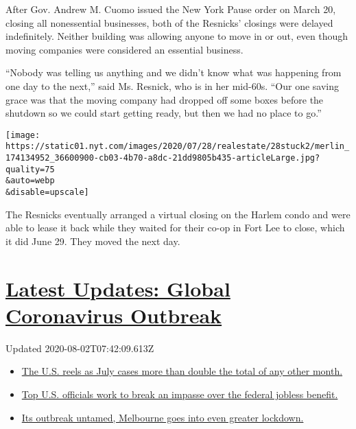 After Gov. Andrew M. Cuomo issued the New York Pause order on March 20,
closing all nonessential businesses, both of the Resnicks' closings were
delayed indefinitely. Neither building was allowing anyone to move in or
out, even though moving companies were considered an essential business.

``Nobody was telling us anything and we didn't know what was happening
from one day to the next,'' said Ms. Resnick, who is in her mid-60s.
``Our one saving grace was that the moving company had dropped off some
boxes before the shutdown so we could start getting ready, but then we
had no place to go.''

\texttt{[image: https://static01.nyt.com/images/2020/07/28/realestate/28stuck2/merlin\_174134952\_36600900-cb03-4b70-a8dc-21dd9805b435-articleLarge.jpg?quality=75\\\&auto=webp\\\&disable=upscale]}

The Resnicks eventually arranged a virtual closing on the Harlem condo
and were able to lease it back while they waited for their co-op in Fort
Lee to close, which it did June 29. They moved the next day.

\hypertarget{latest-updates-global-coronavirus-outbreak}{%
\section{\texorpdfstring{\href{https://www.nytimes.com/2020/08/01/world/coronavirus-covid-19.html?action=click\&pgtype=Article\&state=default\&region=MAIN_CONTENT_1\&context=storylines_live_updates}{Latest
Updates: Global Coronavirus
Outbreak}}{Latest Updates: Global Coronavirus Outbreak}}\label{latest-updates-global-coronavirus-outbreak}}

Updated 2020-08-02T07:42:09.613Z

\begin{itemize}
\tightlist
\item
  \href{https://www.nytimes.com/2020/08/01/world/coronavirus-covid-19.html?action=click\&pgtype=Article\&state=default\&region=MAIN_CONTENT_1\&context=storylines_live_updates\#link-34047410}{The
  U.S. reels as July cases more than double the total of any other
  month.}
\item
  \href{https://www.nytimes.com/2020/08/01/world/coronavirus-covid-19.html?action=click\&pgtype=Article\&state=default\&region=MAIN_CONTENT_1\&context=storylines_live_updates\#link-780ec966}{Top
  U.S. officials work to break an impasse over the federal jobless
  benefit.}
\item
  \href{https://www.nytimes.com/2020/08/01/world/coronavirus-covid-19.html?action=click\&pgtype=Article\&state=default\&region=MAIN_CONTENT_1\&context=storylines_live_updates\#link-2bc8948}{Its
  outbreak untamed, Melbourne goes into even greater lockdown.}
\end{itemize}


